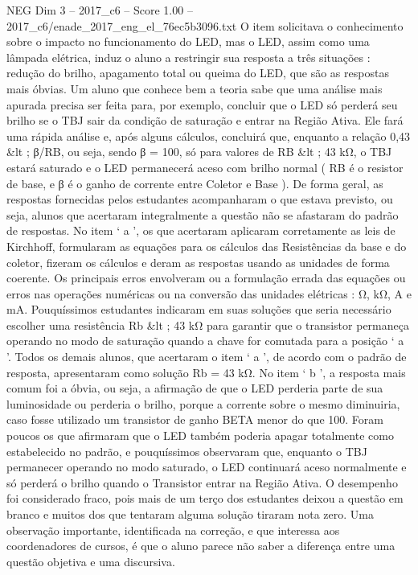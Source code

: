 \begin{textsample}{NEG Dim 3 – 2017\_c6 – Score 1.00 – 2017\_c6/enade\_2017\_eng\_el\_76ec5b3096.txt}
O item solicitava o conhecimento sobre o impacto no funcionamento do LED, mas o LED, assim como uma lâmpada elétrica, induz o aluno a restringir sua resposta a três situações : redução do brilho, apagamento total ou queima do LED, que são as respostas mais óbvias.
Um aluno que conhece bem a teoria sabe que uma análise mais apurada precisa ser feita para, por exemplo, concluir que o LED só perderá seu brilho se o TBJ sair da condição de saturação e entrar na Região Ativa.
Ele fará uma rápida análise e, após alguns cálculos, concluirá que, enquanto a relação 0,43 \&lt ; β/RB, ou seja, sendo β = 100, só para valores de RB \&lt ; 43 kΩ, o TBJ estará saturado e o LED permanecerá aceso com brilho normal ( RB é o resistor de base, e β é o ganho de corrente entre Coletor e Base ).
De forma geral, as respostas fornecidas pelos estudantes acompanharam o que estava previsto, ou seja, alunos que acertaram integralmente a questão não se afastaram do padrão de respostas.
No item ‘ a ’, os que acertaram aplicaram corretamente as leis de Kirchhoff, formularam as equações para os cálculos das Resistências da base e do coletor, fizeram os cálculos e deram as respostas usando as unidades de forma coerente.
Os principais erros envolveram ou a formulação errada das equações ou erros nas operações numéricas ou na conversão das unidades elétricas : Ω, kΩ, A e mA.
Pouquíssimos estudantes indicaram em suas soluções que seria necessário escolher uma resistência Rb \&lt ; 43 kΩ para garantir que o transistor permaneça operando no modo de saturação quando a chave for comutada para a posição ‘ a ’.
Todos os demais alunos, que acertaram o item ‘ a ’, de acordo com o padrão de resposta, apresentaram como solução Rb = 43 kΩ.
No item ‘ b ’, a resposta mais comum foi a óbvia, ou seja, a afirmação de que o LED perderia parte de sua luminosidade ou perderia o brilho, porque a corrente sobre o mesmo diminuiria, caso fosse utilizado um transistor de ganho BETA menor do que 100.
Foram poucos os que afirmaram que o LED também poderia apagar totalmente como estabelecido no padrão, e pouquíssimos observaram que, enquanto o TBJ permanecer operando no modo saturado, o LED continuará aceso normalmente e só perderá o brilho quando o Transistor entrar na Região Ativa.
O desempenho foi considerado fraco, pois mais de um terço dos estudantes deixou a questão em branco e muitos dos que tentaram alguma solução tiraram nota zero.
Uma observação importante, identificada na correção, e que interessa aos coordenadores de cursos, é que o aluno parece não saber a diferença entre uma questão objetiva e uma discursiva.

\end{textsample}
